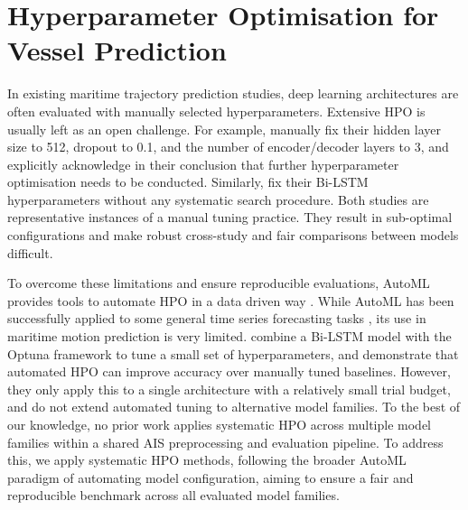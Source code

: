 \section[Hyperparameter Optimisation]{Hyperparameter Optimisation for Vessel Prediction}
\label{sec:hpoforvesselprediction}

In existing maritime trajectory prediction studies, deep learning architectures are often evaluated with manually selected hyperparameters.
Extensive \ac{HPO} is usually left as an open challenge. 
For example, \textcite{donandt2022shortterm} manually fix their hidden layer size to 512, dropout to 0.1, and the number of encoder/decoder layers to 3, and explicitly acknowledge in their conclusion that further hyperparameter optimisation needs to be conducted. Similarly, \textcite{articlebilstmsus} fix their \ac{Bi-LSTM} hyperparameters without any systematic search procedure. %
Both studies are representative instances of a manual tuning practice.
They result in sub-optimal configurations and make robust cross-study and fair comparisons between models difficult. 



To overcome these limitations and ensure reproducible evaluations, \ac{AutoML} provides tools to automate \ac{HPO} in a data driven way \parencite{Feurer2015, AutoMLHoos}.
While \ac{AutoML} has been successfully applied to some general time series forecasting tasks \parencite{deng2023efficient}%
, its use in maritime motion prediction is very limited. \textcite{zhou2024optunabilstm} combine a \acs{Bi-LSTM} model with the Optuna framework to tune a small set of hyperparameters, and demonstrate that automated \ac{HPO} can improve accuracy over manually tuned baselines.
However, they only apply this to a single architecture with a relatively small trial budget, and do not extend automated tuning to alternative model families. To the best of our knowledge, no prior work applies %
systematic \ac{HPO} across multiple model families within a shared \ac{AIS} preprocessing and evaluation pipeline.
To address this, we apply systematic \ac{HPO} methods, following the broader \ac{AutoML} paradigm of automating model configuration, aiming to ensure a fair and reproducible benchmark across all evaluated model families.


